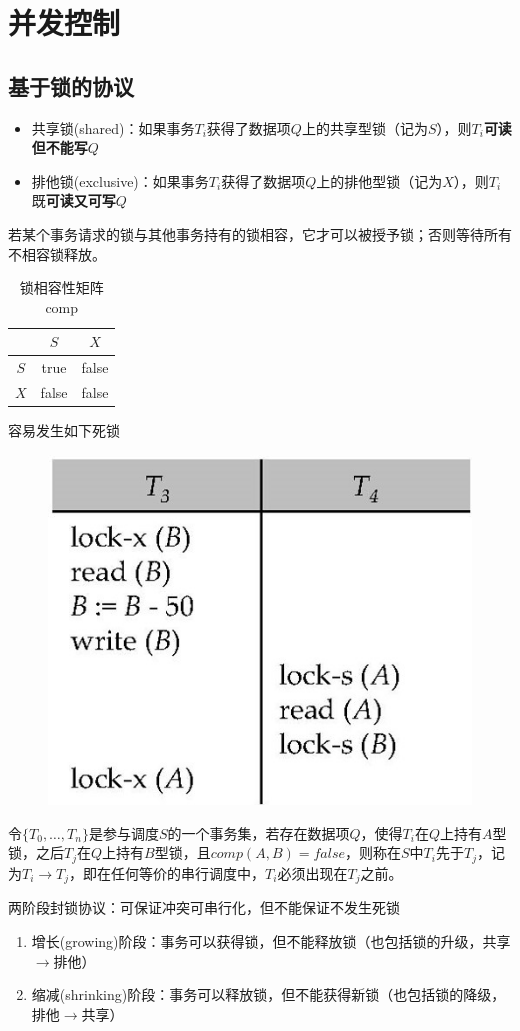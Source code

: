 
\section{并发控制} %
\subsection{基于锁的协议}
\begin{itemize}
	\item 共享锁(shared)：如果事务$T_i$获得了数据项$Q$上的共享型锁（记为$S$），则$T_i$\textbf{可读但不能写}$Q$
	\item 排他锁(exclusive)：如果事务$T_i$获得了数据项$Q$上的排他型锁（记为$X$），则$T_i$既\textbf{可读又可写}$Q$
\end{itemize}

若某个事务请求的锁与其他事务持有的锁相容，它才可以被授予锁；否则等待所有不相容锁释放。
\begin{table}
\centering
\caption{锁相容性矩阵comp}
\begin{tabular}{|c|c|c|}\hline
 & $S$ & $X$\\\hline
$S$ & true & false\\\hline
$X$ & false & false\\\hline
\end{tabular}
\end{table}

容易发生如下死锁
\begin{figure}[H]
\centering
\includegraphics[width=0.3\linewidth]{fig/deadlock.jpg}
\end{figure}

令$\{T_0,\ldots,T_n\}$是参与调度$S$的一个事务集，若存在数据项$Q$，使得$T_i$在$Q$上持有$A$型锁，之后$T_j$在$Q$上持有$B$型锁，且$comp(A,B)=false$，则称在$S$中$T_i$先于$T_j$，记为$T_i\to T_j$，即在任何等价的串行调度中，$T_i$必须出现在$T_j$之前。

两阶段封锁协议：可保证冲突可串行化，但不能保证不发生死锁
\begin{enumerate}
	\item 增长(growing)阶段：事务可以获得锁，但不能释放锁（也包括锁的升级，共享$\to$排他）
	\item 缩减(shrinking)阶段：事务可以释放锁，但不能获得新锁（也包括锁的降级，排他$\to$共享）
\end{enumerate}

